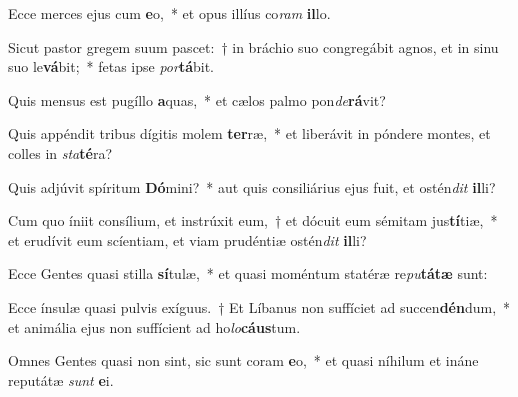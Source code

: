 \item Ecce merces ejus cum \textbf{e}o,~* et opus illíus co\textit{ram} \textbf{il}lo.
\item Sicut pastor gregem suum pascet:~† in bráchio suo congregábit agnos, et in sinu suo le\textbf{vá}bit;~* fetas ipse \textit{por}\textbf{tá}bit.
\item Quis mensus est pugíllo \textbf{a}quas,~* et cælos palmo pon\textit{de}\textbf{rá}vit?
\item Quis appéndit tribus dígitis molem \textbf{ter}ræ,~* et liberávit in póndere montes, et colles in \textit{sta}\textbf{té}ra?
\item Quis adjúvit spíritum \textbf{Dó}mini?~* aut quis consiliárius ejus fuit, et ostén\textit{dit} \textbf{il}li?
\item Cum quo íniit consílium, et instrúxit eum,~† et dócuit eum sémitam jus\textbf{tí}tiæ,~* et erudívit eum scíentiam, et viam prudéntiæ ostén\textit{dit} \textbf{il}li?
\item Ecce Gentes quasi stilla \textbf{sí}tulæ,~* et quasi moméntum statéræ re\textit{pu}\textbf{tá}\textbf{tæ} sunt:
\item Ecce ínsulæ quasi pulvis exíguus.~† Et Líbanus non suffíciet ad succen\textbf{dén}dum,~* et animália ejus non suffícient ad ho\textit{lo}\textbf{cáus}tum.
\item Omnes Gentes quasi non sint, sic sunt coram \textbf{e}o,~* et quasi níhilum et ináne reputátæ \textit{sunt} \textbf{e}i.
